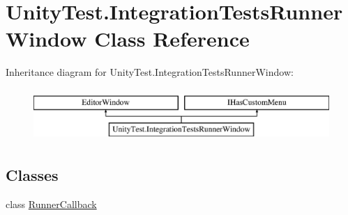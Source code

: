 \hypertarget{class_unity_test_1_1_integration_tests_runner_window}{}\section{Unity\+Test.\+Integration\+Tests\+Runner\+Window Class Reference}
\label{class_unity_test_1_1_integration_tests_runner_window}
Inheritance diagram for Unity\+Test.\+Integration\+Tests\+Runner\+Window\+:\begin{figure}[H]
\begin{center}
\leavevmode
\includegraphics[height=2.000000cm]{class_unity_test_1_1_integration_tests_runner_window}
\end{center}
\end{figure}
\subsection*{Classes}
\begin{DoxyCompactItemize}
\item 
class \hyperlink{class_unity_test_1_1_integration_tests_runner_window_1_1_runner_callback}{Runner\+Callback}
\end{DoxyCompactItemize}
